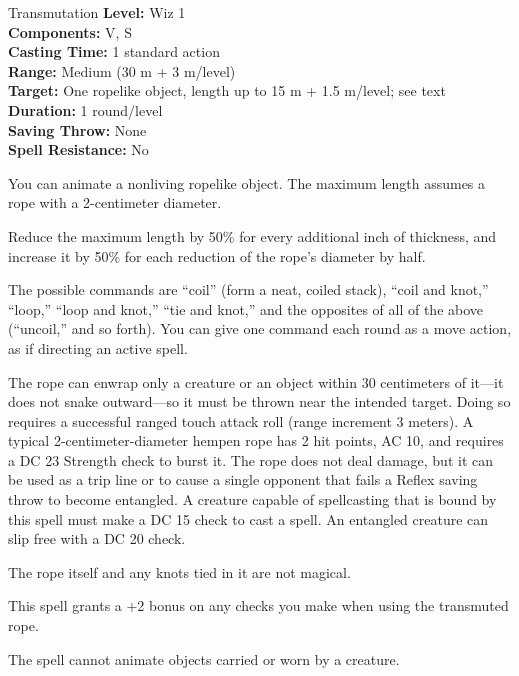 {Transmutation}
{
	\textbf{Level:}
	Wiz 1\\
	\textbf{Components:}
	V, S\\
	\textbf{Casting Time:}
	1 standard action\\
	\textbf{Range:}
	Medium (30 m + 3 m/level)\\
	\textbf{Target:}
	One ropelike object, length up to 15 m + 1.5 m/level; see text\\
	\textbf{Duration:}
	1 round/level\\
	\textbf{Saving Throw:}
	None\\
	\textbf{Spell Resistance:}
	No\\
}
{
	You can animate a nonliving ropelike object. The maximum length assumes a rope with a 2-centimeter diameter.

	Reduce the maximum length by 50\% for every additional inch of thickness, and increase it by 50\% for each reduction of the rope's diameter by half.

	The possible commands are ``coil'' (form a neat, coiled stack), ``coil and knot,'' ``loop,'' ``loop and knot,'' ``tie and knot,'' and the opposites of all of the above (``uncoil,'' and so forth). You can give one command each round as a move action, as if directing an active spell.

	The rope can enwrap only a creature or an object within 30 centimeters of it---it does not snake outward---so it must be thrown near the intended target. Doing so requires a successful ranged touch attack roll (range increment 3 meters). A typical 2-centimeter-diameter hempen rope has 2 hit points, AC 10, and requires a DC 23 Strength check to burst it. The rope does not deal damage, but it can be used as a trip line or to cause a single opponent that fails a Reflex saving throw to become entangled. A creature capable of spellcasting that is bound by this spell must make a DC 15  check to cast a spell. An entangled creature can slip free with a DC 20  check.

	The rope itself and any knots tied in it are not magical.

	This spell grants a +2 bonus on any  checks you make when using the transmuted rope.

	The spell cannot animate objects carried or worn by a creature.

}
